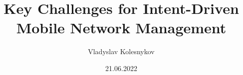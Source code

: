 \def\languages{main=ngerman,english}


\title{Key Challenges for Intent-Driven Mobile Network Management}

\author{Vladyslav Kolesnykov}

\date{21.06.2022}



